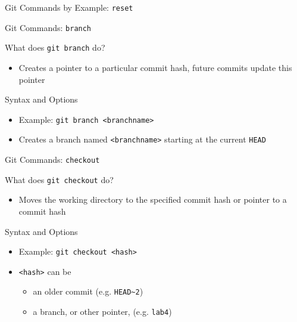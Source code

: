 \documentclass[table,dvipsnames]{beamer}
\begin{document}

\begin{frame}{Git Commands by Example: \texttt{reset}}
\end{frame}

\begin{frame}{Git Commands: \texttt{branch}}
	\begin{block}{What does \texttt{git branch} do?}
		\begin{itemize}
			\item Creates a pointer to a particular commit hash, future commits
				update this pointer
		\end{itemize}
	\end{block}
	\begin{block}{Syntax and Options}
		\begin{itemize}
			\item Example: \texttt{git branch <branchname>}
			\item Creates a branch named \texttt{<branchname>} starting at the
				current \texttt{HEAD}
		\end{itemize}
	\end{block}
\end{frame}

\begin{frame}{Git Commands: \texttt{checkout}}
	\begin{block}{What does \texttt{git checkout} do?}
		\begin{itemize}
			\item Moves the working directory to the specified commit hash or 
				pointer to a commit hash
		\end{itemize}
	\end{block}
	\begin{block}{Syntax and Options}
		\begin{itemize}
			\item Example: \texttt{git checkout <hash>}
			\item \texttt{<hash>} can be 
				\begin{itemize}
					\item an older commit (e.g. \texttt{HEAD\~{}2})
					\item a branch, or other pointer, (e.g. \texttt{lab4})
				\end{itemize}
		\end{itemize}
	\end{block}
\end{frame}
\end{document}
